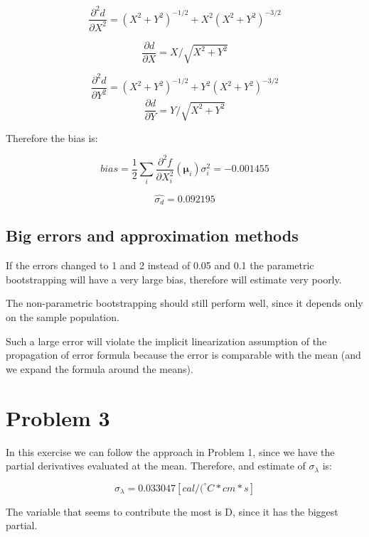 \documentclass[10pt]{article}
\def\ders#1#2{
\frac{\partial #1}{\partial #2}
}
\def\dters#1#2{
\frac{\partial^2 #1}{\partial #2^2}
}
\begin{document}
\[
\dters{d}{X} = \left(X^2+Y^2 \right)^{-1/2}+X^2\left(X^2+Y^2\right)^{-3/2} 
\]

\[
\ders{d}{X} = X/\sqrt{X^2+Y^2}
\]


\[
\dters{d}{Y} = \left(X^2+Y^2 \right)^{-1/2}+Y^2\left(X^2+Y^2\right)^{-3/2} 
\]
\[
\ders{d}{Y} = Y/\sqrt{X^2+Y^2}
\]



Therefore the bias is:

\[
bias = \frac{1}{2} \sum_i \frac{\partial^2f}{\partial X_i^2}(\mathbf \mu_i)\sigma_i^2 = -0.001455
\]

\[
\hat{\sigma_d} = 0.092195
\]



\subsection{Big errors and approximation methods}
If the errors changed to 1 and 2 instead of 0.05 and 0.1 the parametric bootstrapping will
have a very large bias, therefore will estimate very poorly.

The non-parametric bootstrapping should still perform well, since it depends only 
on the sample population.

Such a large error will violate the implicit linearization assumption of the propagation
of error formula because  the error is comparable with the mean (and we expand the 
formula around the means).


\section{Problem 3}
In this exercise we can follow the approach in Problem 1, since we have the 
partial derivatives evaluated at the mean. Therefore, and estimate of $\sigma_{\lambda}$ is:

\[
\sigma_{\lambda} =0.033047 [cal/(^\circ C* cm* s]
\]

The variable that seems to contribute the most is D, since it has the biggest partial.
\end{document}
